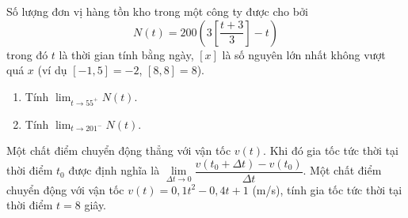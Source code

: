 \begin{vd}%
Số lượng đơn vị hàng tồn kho trong một công ty  được cho bởi
$$
N(t)=200\left(3 \left [\frac{t+3}{3}  \right ]-t\right)
$$
trong đó $t$ là thời gian tính bằng ngày, $[x]$ là số nguyên lớn nhất không vượt quá $x$ (ví dụ $[-1{,}5]=-2$, $[8{,}8] = 8$).
\begin{enumerate}
\item Tính $\displaystyle \lim_{t \to 55^+} N(t)$.
\item  Tính $\displaystyle \lim_{t \to 201^-} N(t)$.
\end{enumerate}
\end{vd}


\begin{vd}%
Một chất điểm chuyển động thẳng với vận tốc $v(t)$. Khi đó gia tốc tức thời tại thời điểm $t_0$ được định nghĩa là $\displaystyle \lim \limits_{\Delta t \to 0} \dfrac{v(t_0+ \Delta t) - v(t_0)}{\Delta t}$. Một chất điểm chuyển động với vận tốc $v(t) = 0{,}1t^2-0{,}4t+1$ (m/s), tính gia tốc tức thời tại thời điểm $t=8$ giây. 
\end{vd}

